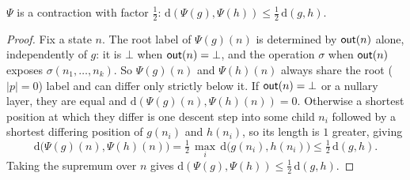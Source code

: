 \begin{lemma}\label{lem:guarded}
  $\Psi$ is a contraction with factor $\tfrac{1}{2}$:
  $\mathrm{d}(\Psi(g),\Psi(h)) \le \tfrac{1}{2}\,\mathrm{d}(g,h)$.
\end{lemma}
\begin{proof}
  Fix a state $n$. The root label of $\Psi(g)(n)$ is determined by $\mathsf{out}(n)$ alone, independently of
  $g$: it is $\bot$ when $\mathsf{out}(n) = \bot$, and the operation $\sigma$ when $\mathsf{out}(n)$ exposes
  $\sigma(n_1,\dots,n_k)$. So $\Psi(g)(n)$ and $\Psi(h)(n)$ always share the root ($|p| = 0$) label and
  can differ only strictly below it. If $\mathsf{out}(n) = \bot$ or a nullary layer, they are equal and
  $\mathrm{d}(\Psi(g)(n),\Psi(h)(n)) = 0$. Otherwise a shortest position at which they differ is one
  descent step into some child $n_i$ followed by a shortest differing position of $g(n_i)$ and $h(n_i)$,
  so its length is $1$ greater, giving
  \[
    \mathrm{d}\big(\Psi(g)(n),\Psi(h)(n)\big) = \tfrac{1}{2}\,\max_{i}\,\mathrm{d}\big(g(n_i),h(n_i)\big)
    \le \tfrac{1}{2}\,\mathrm{d}(g,h).
  \]
  Taking the supremum over $n$ gives $\mathrm{d}(\Psi(g),\Psi(h)) \le \tfrac{1}{2}\,\mathrm{d}(g,h)$.
\end{proof}

